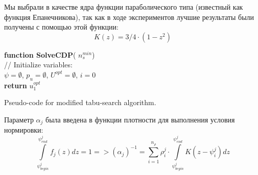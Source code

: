 \documentclass[]{TAACpaper}
\begin{document}
Мы выбрали в качестве ядра функции параболического типа (известный как функция Епанечникова), так как в ходе экспериментов лучшие результаты были получены с помощью этой функции:
 \begin{equation} \label{dist_density}
  K(z) = 3/4 \cdot (1-z^2)
 \end{equation}
 

\begin{algorithm}[H]
	\textbf{function SolveCDP}( $n^{min}_s$) \\
	// Initialize variables:	\\
	
	$\psi = \emptyset$,
	$p_u = \emptyset$,
	$U^{opt} = \emptyset$,
	$i=0$ \\
	
	\textbf{return} $u^{opt}_1$
	
	\caption{Pseudo-code for modified tabu-search algorithm.}
	\label{alg:modTabuSearch}
\end{algorithm}

Параметр $\alpha_j $ была введена в функции плотности для выполнения условия нормировки:
\begin{equation} \label{norm_cond}
 \int\limits_{\psi^j_{begin}}^{\psi^j_{end}} f_j(z)dz = 1  =>  (\alpha_j)^{-1} = \sum\limits_{i=1}^{n_{\rho}} \rho^j_i \cdot  \int\limits_{\psi^j_{begin}}^{\psi^j_{end}} K(z -  \psi^j_i) dz 
 \end{equation}
\end{document}
